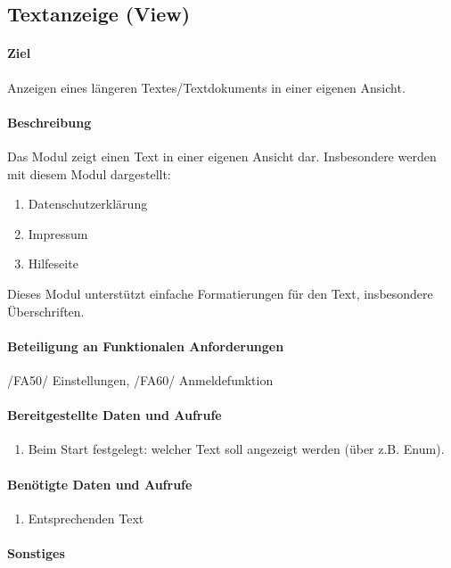 \subsection{Textanzeige (View)}
\paragraph{Ziel}
Anzeigen eines längeren Textes/Textdokuments in einer eigenen Ansicht.
\paragraph{Beschreibung}
Das Modul zeigt einen Text in einer eigenen Ansicht dar.
Insbesondere werden mit diesem Modul dargestellt:
\begin{enumerate}
    \item Datenschutzerklärung
    \item Impressum
    \item Hilfeseite
\end{enumerate}
Dieses Modul unterstützt einfache Formatierungen für den Text, insbesondere Überschriften.
\paragraph{Beteiligung an Funktionalen Anforderungen}
/FA50/ Einstellungen, /FA60/ Anmeldefunktion
\paragraph{Bereitgestellte Daten und Aufrufe}
    \begin{enumerate}
        \item Beim Start festgelegt: welcher Text soll angezeigt werden (über z.B. Enum).
    \end{enumerate}
\paragraph{Benötigte Daten und Aufrufe}
\begin{enumerate}
    \item Entsprechenden Text
\end{enumerate}
\paragraph{Sonstiges}